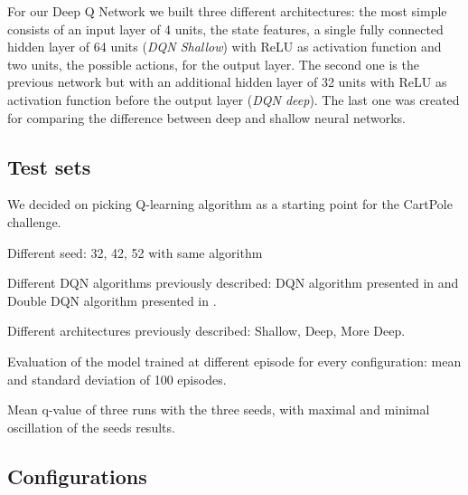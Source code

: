 For our Deep Q Network we built three different architectures: the most simple consists of an input layer of 4 units, the state features, a single fully connected hidden layer of 64 units (\textit{DQN Shallow}) with ReLU as activation function and two units, the possible actions, for the output layer. The second one is the previous network but with an additional hidden layer of 32 units with ReLU as activation function before the output layer (\textit{DQN deep}). %
The last one was created for comparing the difference between deep and shallow neural networks.

\subsection{Test sets}

We decided on picking Q-learning algorithm as a starting point for the CartPole challenge.

Different seed: 32, 42, 52 with same algorithm

Different DQN algorithms previously described:
DQN algorithm presented in \cite{Mnih2015} and Double DQN algorithm presented in \cite{Hasselt:2016:DRL:3016100.3016191}.

Different architectures previously described: Shallow, Deep, More Deep.

Evaluation of the model trained at different episode for every configuration:
mean and standard deviation of 100 episodes.

Mean q-value of three runs with the three seeds, with maximal and minimal oscillation of the seeds results.

\subsection{Configurations}




